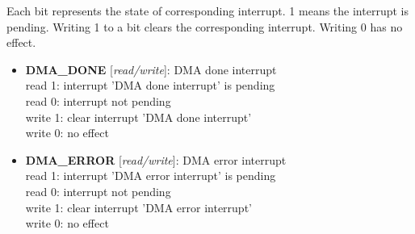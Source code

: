 \vspace{12pt}
Each bit represents the state of corresponding interrupt. 1 means the interrupt is pending. Writing 1 to a bit clears the corresponding interrupt. Writing 0 has no effect.

\vspace{12pt}
\noindent
{}

\begin{itemize}
\item \begin{small}
{\bf 
DMA\_DONE
} [\emph{read/write}]: DMA done interrupt
\\
read 1: interrupt 'DMA done interrupt' is pending\\read 0: interrupt not pending\\write 1: clear interrupt 'DMA done interrupt'\\write 0: no effect
\end{small}
\item \begin{small}
{\bf 
DMA\_ERROR
} [\emph{read/write}]: DMA error interrupt
\\
read 1: interrupt 'DMA error interrupt' is pending\\read 0: interrupt not pending\\write 1: clear interrupt 'DMA error interrupt'\\write 0: no effect
\end{small}
\end{itemize}


